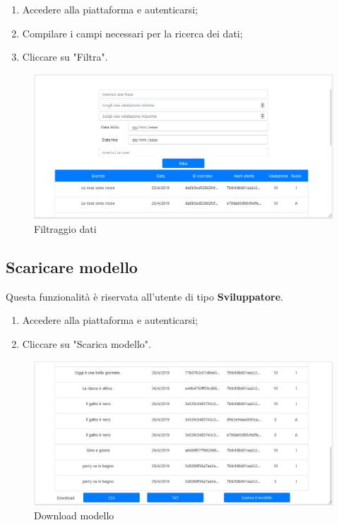 \documentclass[11pt,a4paper]{article}
\begin{document}
{		\begin{enumerate}
			\item Accedere alla piattaforma e autenticarsi;
			\item Compilare i campi necessari per la ricerca dei dati;
			\item Cliccare su "Filtra".
		\end{enumerate}
	
		\begin{center}
		\begin{figure}[h]
		\centering
		\includegraphics[scale=0.65]{images/filtrodati.jpg}
		\caption{Filtraggio dati}
		\end{figure}
		\end{center}
	
	\newpage
	\subsection{Scaricare modello}
		Questa funzionalità è riservata all'utente di tipo \textbf{Sviluppatore}.\\
		
		\begin{enumerate}
			\item Accedere alla piattaforma e autenticarsi;
			\item Cliccare su "Scarica modello".
		\end{enumerate}
	
	\begin{center}
	\begin{figure}[h]
		\includegraphics[scale=0.65]{images/scaricamodello.jpg}
		\caption{Download modello}
	\end{figure}
\end{center}
				
}
\end{document}
